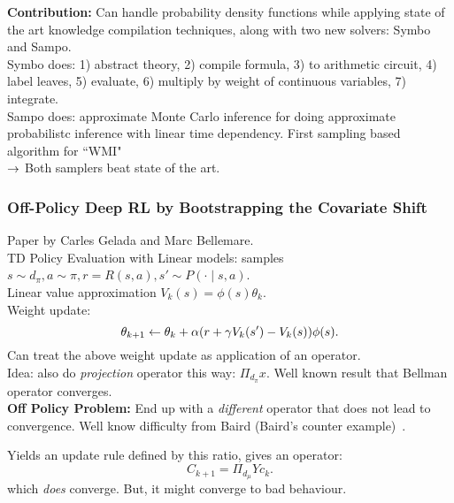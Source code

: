 {\bf Contribution:} Can handle probability density functions while applying state of the art knowledge compilation techniques, along with two new solvers: Symbo and Sampo. \\

Symbo does: 1) abstract theory, 2) compile formula, 3) to arithmetic circuit, 4) label leaves, 5) evaluate, 6) multiply by weight of continuous variables, 7) integrate. \\

Sampo does: approximate Monte Carlo inference for doing approximate probabilistc inference with linear time dependency.  First sampling based algorithm for ``WMI"\\

$\rightarrow$ Both samplers beat state of the art.



\subsubsection{Off-Policy Deep RL by Bootstrapping the Covariate Shift}

Paper by Carles Gelada and Marc Bellemare. \\

TD Policy Evaluation with Linear models: samples $s \sim d_\pi, a \sim \pi, r = R(s,a), s' \sim P(\cdot \mid s, a)$. \\

Linear value approximation $V_k(s) = \phi(s) \theta_k$. \\

Weight update:
\[
\theta_{k+1} \leftarrow \theta_k + \alpha(r + \gamma V_k(s') - V_k(s)) \phi(s).
\]
Can treat the above weight update as application of an operator. \\

Idea: also do {\it projection} operator this way: $\Pi_{d_\pi} x$. Well known result that Bellman operator converges. \\

{\bf Off Policy Problem:} End up with a {\it different} operator that does not lead to convergence. Well know difficulty from Baird (Baird's counter example)~\cite{baird1995residual}. \\


Yields an update rule defined by this ratio, gives an operator:
\[
C_{k+1} = \Pi_{d_\mu} Y c_k.
\]
which {\it does} converge. But, it might converge to bad behaviour. \\

